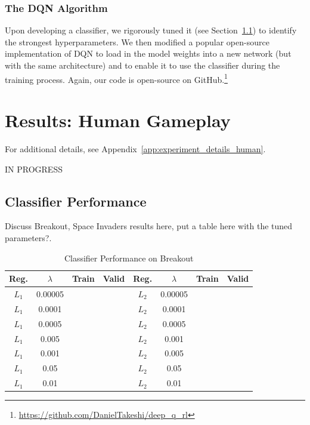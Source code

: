 \documentclass[letterpaper, 10pt, conference]{ieeeconf}
\begin{document}
\subsubsection{The DQN Algorithm} Upon developing a classifier, we rigorously
tuned it (see Section~\ref{ssec:results_classifier}) to identify the strongest
hyperparameters. We then modified a popular open-source implementation of DQN to
load in the model weights into a new network (but with the same architecture)
and to enable it to use the classifier during the training process. Again, our
code is open-source on
GitHub.\footnote{\url{https://github.com/DanielTakeshi/deep_q_rl}}



\section{Results: Human Gameplay}\label{sec:results_p1}

For additional details, see Appendix~\ref{app:experiment_details_human}.

IN PROGRESS

\subsection{Classifier Performance}\label{ssec:results_classifier}

Discuss Breakout, Space Invaders results here, put a table here with the tuned
parameters?.

\begin{table}[!t]
\renewcommand{\arraystretch}{1.3}
\caption{Classifier Performance on Breakout}
\label{tab:breakout}
\centering
\begin{tabular}{c c c c | c c c c}
\hline
Reg.  & $\lambda$ & Train & Valid & Reg.  & $\lambda$ & Train & Valid \\
\hline
$L_1$ & 0.00005   &   &   & $L_2$ & 0.00005   &   &  \\
$L_1$ & 0.0001    &   &   & $L_2$ & 0.0001    &   &  \\
$L_1$ & 0.0005    &   &   & $L_2$ & 0.0005    &   &  \\
$L_1$ & 0.005     &   &   & $L_2$ & 0.001     &   &  \\
$L_1$ & 0.001     &   &   & $L_2$ & 0.005     &   &  \\
$L_1$ & 0.05      &   &   & $L_2$ & 0.05      &   &  \\
$L_1$ & 0.01      &   &   & $L_2$ & 0.01      &   &  \\
\hline
\end{tabular}
\end{table}
\end{document}
